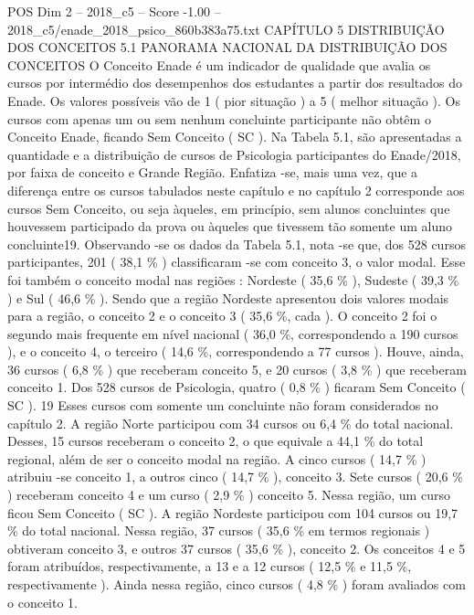 \begin{textsample}{POS Dim 2 – 2018\_c5 – Score -1.00 – 2018\_c5/enade\_2018\_psico\_860b383a75.txt}  \label{ex:f2_pos_317}
CAPÍTULO 5 DISTRIBUIÇÃO DOS CONCEITOS 5.1 PANORAMA NACIONAL DA DISTRIBUIÇÃO DOS CONCEITOS O Conceito Enade é um indicador de qualidade que avalia os cursos por intermédio dos desempenhos dos estudantes a partir dos resultados do Enade.
Os valores possíveis vão de 1 ( pior situação ) a 5 ( melhor situação ).
Os cursos com apenas um ou sem nenhum concluinte participante não obtêm o Conceito Enade, ficando Sem Conceito ( SC ).
Na Tabela 5.1, são apresentadas a quantidade e a distribuição de cursos de Psicologia participantes do Enade/2018, por faixa de conceito e Grande Região.
Enfatiza -se, mais uma vez, que a diferença entre os cursos tabulados neste capítulo e no capítulo 2 corresponde aos cursos Sem Conceito, ou seja àqueles, em princípio, sem alunos concluintes que houvessem participado da prova ou àqueles que tivessem tão somente um aluno concluinte19.
Observando -se os dados da Tabela 5.1, nota -se que, dos 528 cursos participantes, 201 ( 38,1 \% ) classificaram -se com conceito 3, o valor modal.
Esse foi também o conceito modal nas regiões : Nordeste ( 35,6 \% ), Sudeste ( 39,3 \% ) e Sul ( 46,6 \% ).
Sendo que a região Nordeste apresentou dois valores modais para a região, o conceito 2 e o conceito 3 ( 35,6 \%, cada ).
O conceito 2 foi o segundo mais frequente em nível nacional ( 36,0 \%, correspondendo a 190 cursos ), e o conceito 4, o terceiro ( 14,6 \%, correspondendo a 77 cursos ).
Houve, ainda, 36 cursos ( 6,8 \% ) que receberam conceito 5, e 20 cursos ( 3,8 \% ) que receberam conceito 1.
Dos 528 cursos de Psicologia, quatro ( 0,8 \% ) ficaram Sem Conceito ( SC ). 19 Esses cursos com somente um concluinte não foram considerados no capítulo 2.
A região Norte participou com 34 cursos ou 6,4 \% do total nacional.
Desses, 15 cursos receberam o conceito 2, o que equivale a 44,1 \% do total regional, além de ser o conceito modal na região.
A cinco cursos ( 14,7 \% ) atribuiu -se conceito 1, a outros cinco ( 14,7 \% ), conceito 3.
Sete cursos ( 20,6 \% ) receberam conceito 4 e um curso ( 2,9 \% ) conceito 5.
Nessa região, um curso ficou Sem Conceito ( SC ).
A região Nordeste participou com 104 cursos ou 19,7 \% do total nacional.
Nessa região, 37 cursos ( 35,6 \% em termos regionais ) obtiveram conceito 3, e outros 37 cursos ( 35,6 \% ), conceito 2.
Os conceitos 4 e 5 foram atribuídos, respectivamente, a 13 e a 12 cursos ( 12,5 \% e 11,5 \%, respectivamente ).
Ainda nessa região, cinco cursos ( 4,8 \% ) foram avaliados com o conceito 1.

\end{textsample}
